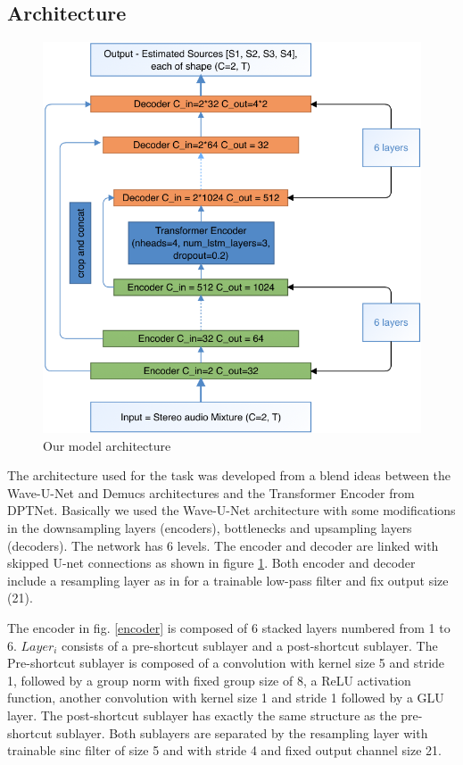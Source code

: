 \documentclass[final]{cvpr}
\begin{document}
\subsection{Architecture}

\begin{figure}
   \includegraphics[scale=0.3]{architecture.png}
   \caption{Our model architecture}
   \label{our-architecture}
\end{figure}

The architecture used for the task was developed from a blend ideas between the Wave-U-Net \cite{waveunet} and Demucs \cite{defossez2019music} architectures and the Transformer Encoder from DPTNet\cite{dptnet}.
Basically we used the Wave-U-Net \cite{waveunet} architecture with some modifications in the downsampling layers (encoders), bottlenecks and upsampling layers (decoders).
The network has 6 levels. The encoder and decoder are linked with skipped U-net connections as shown in figure \ref{our-architecture}. Both encoder and decoder include a resampling layer as in \cite{waveunet} for a trainable low-pass filter and fix output size (21). 

The encoder in fig. \ref{encoder} is composed of 6 stacked layers numbered from 1 to 6. $Layer_i$ consists of a pre-shortcut sublayer and a post-shortcut sublayer. The Pre-shortcut sublayer is composed of a convolution with kernel size 5 and stride 1, followed by a group norm with fixed group size of 8, a ReLU activation function, another convolution with kernel size 1 and stride 1 followed by a GLU layer. The post-shortcut sublayer has exactly the same structure as the pre-shortcut sublayer. Both sublayers are separated by the resampling layer \cite{waveunet} with trainable sinc filter of size 5 and with stride 4 and fixed output channel size 21.
\end{document}
